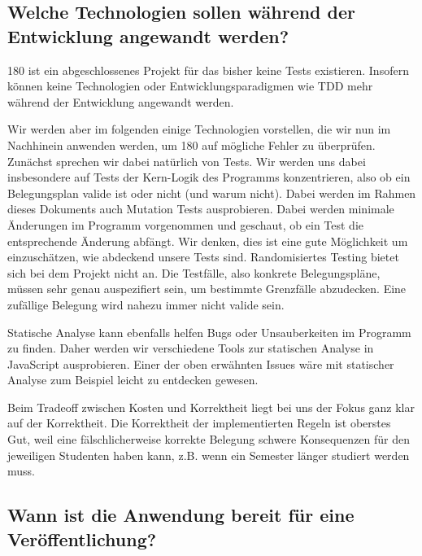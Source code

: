 \documentclass[ngerman]{article}
\begin{document}
\subsection{Welche Technologien sollen während der Entwicklung angewandt werden?}

180 ist ein abgeschlossenes Projekt für das bisher keine Tests existieren.
Insofern können keine Technologien oder Entwicklungsparadigmen wie TDD mehr während der Entwicklung angewandt werden.

Wir werden aber im folgenden einige Technologien vorstellen, die wir nun im Nachhinein anwenden werden, um 180 auf mögliche Fehler zu überprüfen.
Zu\-nächst sprechen wir dabei natürlich von Tests.
Wir werden uns dabei insbesondere auf Tests der Kern-Logik des Programms konzentrieren, also ob ein Belegungsplan valide ist oder nicht (und warum nicht).
Dabei werden im Rahmen dieses Dokuments auch Mutation Tests ausprobieren.
Dabei werden minimale Änderungen im Programm vorgenommen und geschaut, ob ein Test die entsprechende Änderung abfängt.
Wir denken, dies ist eine gute Möglichkeit um einzuschätzen, wie abdeckend unsere Tests sind.
Randomisiertes Testing bietet sich bei dem Projekt nicht an.
Die Testfälle, also konkrete Belegungspläne, müssen sehr genau auspezifiert sein, um bestimmte Grenzfälle abzudecken.
Eine zufällige Belegung wird nahezu immer nicht valide sein.

Statische Analyse kann ebenfalls helfen Bugs oder Unsauberkeiten im Programm zu finden.
Daher werden wir verschiedene Tools zur statischen Analyse in JavaScript ausprobieren.
Einer der oben erwähnten Issues wäre mit statischer Analyse zum Beispiel leicht zu entdecken gewesen.


Beim Tradeoff zwischen Kosten und Korrektheit liegt bei uns der Fokus ganz klar auf der Korrektheit.
Die Korrektheit der implementierten Regeln ist oberstes Gut, weil eine fälschlicherweise korrekte Belegung schwere Konsequenzen für den jeweiligen Studenten haben kann, z.B. wenn ein Semester länger studiert werden muss.


\subsection{Wann ist die Anwendung bereit für eine Veröffentlichung?}
\end{document}

